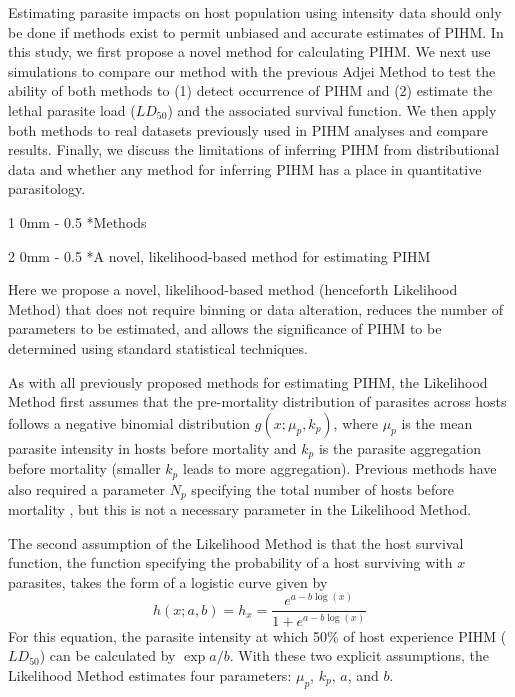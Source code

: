 \documentclass[12pt, a4paper]{article}
\makeatletter
\renewcommand{\section}{\@startsection
{section}%
{1}%
{0mm}%
{-\baselineskip}%
{0.5\baselineskip}%
{\normalfont\bf\large}} %
\renewcommand{\subsection}{\@startsection
{subsection}%
{2}%
{0mm}%
{-\baselineskip}%
{0.5\baselineskip}%
{\normalfont\bf}} %
\makeatother
\begin{document}
Estimating parasite impacts on host population using intensity data should only
be done if methods exist to permit unbiased and accurate estimates of PIHM. In
this study, we first propose a novel method for calculating PIHM. We
next use simulations to compare our method with the previous Adjei
Method to test the ability of both methods to (1) detect occurrence of PIHM and (2) estimate the
lethal parasite load ($LD_{50}$) and the associated survival function.  We then
apply both methods to real datasets previously used in PIHM analyses and
compare results. Finally, we discuss the limitations of inferring PIHM
from distributional data and whether any method for inferring PIHM has a place
in quantitative parasitology.

\section*{Methods}

\subsection*{A novel, likelihood-based method for estimating PIHM}

Here we propose a novel, likelihood-based method (henceforth Likelihood Method) that does not
require binning or data alteration, reduces the number of
parameters to be estimated, and allows the significance of PIHM to be determined
using standard statistical techniques.

As with all previously proposed methods for estimating PIHM, the
Likelihood Method first assumes that the pre-mortality distribution of parasites across hosts follows a
negative binomial distribution $g(x; \mu_p, k_p)$, where $\mu_p$ is the mean parasite intensity in hosts before mortality and $k_p$ is the parasite aggregation before mortality (smaller $k_p$ leads to more aggregation).   Previous methods have also required a parameter $N_p$ specifying the total number of hosts before mortality \citep{Crofton1971a,Adjei1986}, but this is not a necessary parameter in the Likelihood Method.

The second assumption of the Likelihood Method is that the host survival function, the function specifying the probability of a host surviving with $x$ parasites, takes the form of a logistic curve given by
\begin{equation}
    h(x ; a, b) = h_x = \dfrac{e^{a - b \log(x)}}{1 + e^{a - b \log(x)}}
    \label{eq:logistic}
\end{equation}
For this equation, the parasite intensity at which 50\% of host experience PIHM ($LD_{50}$) can be calculated by $\exp{a / b}$. With these two explicit assumptions, the Likelihood Method estimates four parameters: $\mu_p$, $k_p$, $a$, and $b$.
\end{document}

